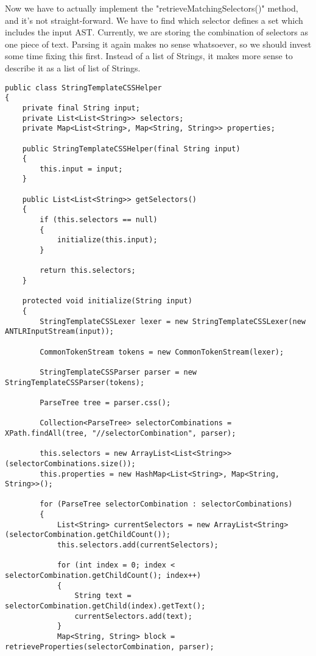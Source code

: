 \documentclass[11pt]{article}
\begin{document}
Now we have to actually implement the "retrieveMatchingSelectors()" method, and it's not straight-forward. We
have to find which selector defines a set which includes the input AST. Currently, we are storing the combination of 
selectors as one piece of text. Parsing it again makes no sense whatsoever, so we should invest some time fixing this first.
Instead of a list of Strings, it makes more sense to describe it as a list of list of Strings.

\begin{verbatim}
public class StringTemplateCSSHelper
{
    private final String input;
    private List<List<String>> selectors;
    private Map<List<String>, Map<String, String>> properties;

    public StringTemplateCSSHelper(final String input)
    {
        this.input = input;
    }

    public List<List<String>> getSelectors()
    {
        if (this.selectors == null)
        {
            initialize(this.input);
        }

        return this.selectors;
    }

    protected void initialize(String input)
    {
        StringTemplateCSSLexer lexer = new StringTemplateCSSLexer(new ANTLRInputStream(input));

        CommonTokenStream tokens = new CommonTokenStream(lexer);

        StringTemplateCSSParser parser = new StringTemplateCSSParser(tokens);

        ParseTree tree = parser.css();

        Collection<ParseTree> selectorCombinations = XPath.findAll(tree, "//selectorCombination", parser);

        this.selectors = new ArrayList<List<String>>(selectorCombinations.size());
        this.properties = new HashMap<List<String>, Map<String, String>>();

        for (ParseTree selectorCombination : selectorCombinations)
        {
            List<String> currentSelectors = new ArrayList<String>(selectorCombination.getChildCount());
            this.selectors.add(currentSelectors);

            for (int index = 0; index < selectorCombination.getChildCount(); index++)
            {
                String text = selectorCombination.getChild(index).getText();
                currentSelectors.add(text);
            }
            Map<String, String> block = retrieveProperties(selectorCombination, parser);


\end{verbatim}
\end{document}
